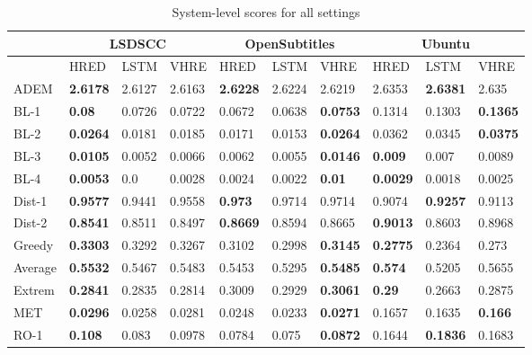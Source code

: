 \begin{table}%
    \centering%
    \caption{System-level scores for all settings}%
    \small
    \label{tab:system_scores}%
    \setlength{\tabcolsep}{0.11cm}%
    \begin{tabular}{|l|l|l|l|l|l|l|l|l|l|}%
        \hline
        & \multicolumn{3}{c|}{LSDSCC} & \multicolumn{3}{c|}{OpenSubtitles} & \multicolumn{3}{c|}{Ubuntu}\\%
        \hline
        & HRED & LSTM & VHRE & HRED & LSTM & VHRE & HRED & LSTM & VHRE\\%
        \hline%
        ADEM & \textbf{2.6178} & 2.6127 & 2.6163 & \textbf{2.6228} & 2.6224 & 2.6219 & 2.6353 & \textbf{2.6381} & 2.635\\\hline
        BL{-}1 & \textbf{0.08} & 0.0726 & 0.0722 & 0.0672 & 0.0638 & \textbf{0.0753} & 0.1314 & 0.1303 & \textbf{0.1365}\\\hline
        BL{-}2 & \textbf{0.0264} & 0.0181 & 0.0185 & 0.0171 & 0.0153 & \textbf{0.0264} & 0.0362 & 0.0345 & \textbf{0.0375}\\\hline
        BL{-}3 & \textbf{0.0105} & 0.0052 & 0.0066 & 0.0062 & 0.0055 & \textbf{0.0146} & \textbf{0.009} & 0.007 & 0.0089\\\hline
        BL{-}4 & \textbf{0.0053} & 0.0 & 0.0028 & 0.0024 & 0.0022 & \textbf{0.01} & \textbf{0.0029} & 0.0018 & 0.0025\\\hline
        Dist{-}1 & \textbf{0.9577} & 0.9441 & 0.9558 & \textbf{0.973} & 0.9714 & 0.9714 & 0.9074 & \textbf{0.9257} & 0.9113\\\hline
        Dist{-}2 & \textbf{0.8541} & 0.8511 & 0.8497 & \textbf{0.8669} & 0.8594 & 0.8665 & \textbf{0.9013} & 0.8603 & 0.8968\\\hline
        Greedy & \textbf{0.3303} & 0.3292 & 0.3267 & 0.3102 & 0.2998 & \textbf{0.3145} & \textbf{0.2775} & 0.2364 & 0.273\\\hline
        Average & \textbf{0.5532} & 0.5467 & 0.5483 & 0.5453 & 0.5295 & \textbf{0.5485} & \textbf{0.574} & 0.5205 & 0.5655\\\hline
        Extrem & \textbf{0.2841} & 0.2835 & 0.2814 & 0.3009 & 0.2929 & \textbf{0.3061} & \textbf{0.29} & 0.2663 & 0.2875\\\hline
        MET & \textbf{0.0296} & 0.0258 & 0.0281 & 0.0248 & 0.0233 & \textbf{0.0271} & 0.1657 & 0.1635 & \textbf{0.166}\\\hline
        RO{-}1 & \textbf{0.108} & 0.083 & 0.0978 & 0.0784 & 0.075 & \textbf{0.0872} & 0.1644 & \textbf{0.1836} & 0.1683\\\hline

\end{tabular}
\end{table}
